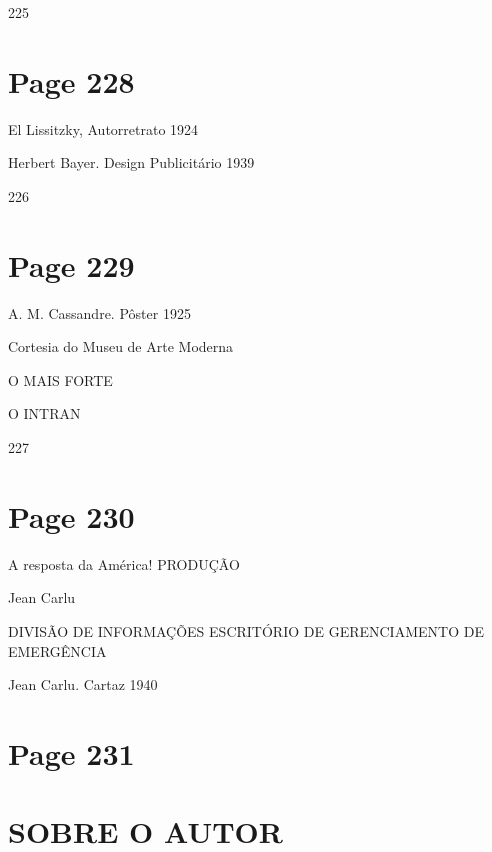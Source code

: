 \documentclass[a4paper]{article}
\begin{document}
225

\newpage
\section*{Page 228}

El Lissitzky, Autorretrato 1924

\par\vspace*{15em} %

Herbert Bayer. Design Publicitário 1939

\par\vspace*{\fill} %

\begin{center}
226
\end{center}

\newpage
\section*{Page 229}

A. M. Cassandre. Pôster 1925

Cortesia do Museu de Arte Moderna

O MAIS FORTE

O INTRAN

227

\newpage
\section*{Page 230}

\raggedright
A resposta da América!
PRODUÇÃO

Jean Carlu

DIVISÃO DE INFORMAÇÕES
ESCRITÓRIO DE GERENCIAMENTO DE EMERGÊNCIA

\bigskip

Jean Carlu. Cartaz 1940

\vfill
{}

\newpage
\section*{Page 231}

\section*{SOBRE O AUTOR}
\end{document}
